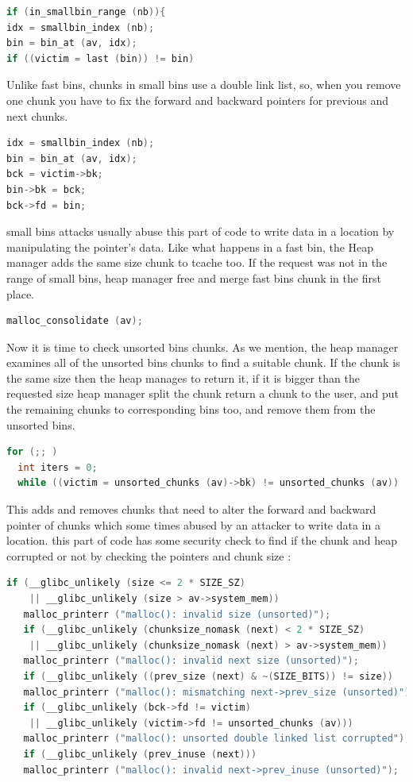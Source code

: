 \documentclass{masterthesis}
\newcommand*\tch{tcache}
\newcommand*\fb{fast bins}
\newcommand*\ub{unsorted bins}
\newcommand*\sbs{small bins}
\begin{document}
\begin{lstlisting}[language=c,frame=tlrb]
if (in_smallbin_range (nb)){
idx = smallbin_index (nb);
bin = bin_at (av, idx);
if ((victim = last (bin)) != bin)
\end{lstlisting}

Unlike \fb{}, chunks in \sbs{} use a double link list, so, when you remove one chunk you have to fix the forward and backward pointers for previous and next chunks. 

\begin{lstlisting}[language=c,frame=tlrb]
idx = smallbin_index (nb);
bin = bin_at (av, idx);
bck = victim->bk;
bin->bk = bck;
bck->fd = bin;
\end{lstlisting}

\sbs{} attacks usually abuse this part of code to write data in a location by manipulating the pointer's data. Like what happens in a fast bin, the Heap manager adds the same size chunk to \tch{} too. If the request was not in the range of \sbs{}, heap manager free and merge \fb{} chunk in the first place.
\begin{lstlisting}[language=c,frame=tlrb]
malloc_consolidate (av);
\end{lstlisting}

Now it is time to check \ub{} chunks. As we mention, the heap manager examines all of the \ub{} chunks to find a suitable chunk. If the chunk is the same size then the heap manages to return it, if it is bigger than the requested size heap manager split the chunk return a chunk to the user, and put the remaining chunks to corresponding bins too, and remove them from the \ub{}.

\begin{lstlisting}[language=c]
for (;; )  
  int iters = 0;
  while ((victim = unsorted_chunks (av)->bk) != unsorted_chunks (av))
\end{lstlisting}
This adds and removes chunks that need to alter the forward and backward pointer of chunks which some times abused by an attacker to write data in a location. this part of code has some security check to find if the chunk and heap corrupted or not by checking the pointers and chunk size :
\begin{lstlisting}[language=c,frame=tlrb]
   if (__glibc_unlikely (size <= 2 * SIZE_SZ)
    || __glibc_unlikely (size > av->system_mem))
   malloc_printerr ("malloc(): invalid size (unsorted)");
   if (__glibc_unlikely (chunksize_nomask (next) < 2 * SIZE_SZ)
    || __glibc_unlikely (chunksize_nomask (next) > av->system_mem))
   malloc_printerr ("malloc(): invalid next size (unsorted)");
   if (__glibc_unlikely ((prev_size (next) & ~(SIZE_BITS)) != size))
   malloc_printerr ("malloc(): mismatching next->prev_size (unsorted)");
   if (__glibc_unlikely (bck->fd != victim)
    || __glibc_unlikely (victim->fd != unsorted_chunks (av)))
   malloc_printerr ("malloc(): unsorted double linked list corrupted");
   if (__glibc_unlikely (prev_inuse (next)))
   malloc_printerr ("malloc(): invalid next->prev_inuse (unsorted)");
\end{lstlisting}
\end{document}
